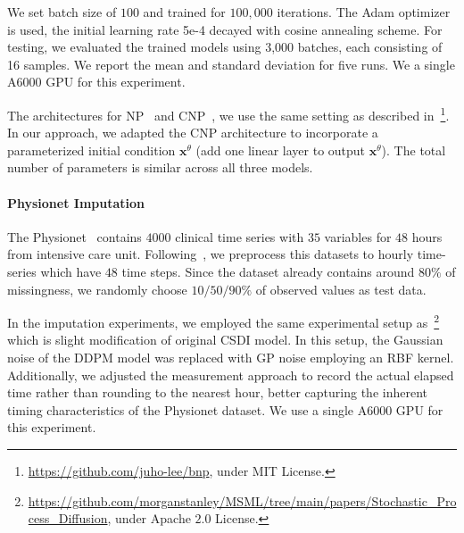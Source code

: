 \documentclass[nohyperref]{article}
\theoremstyle{plain}
\theoremstyle{remark}
\newcommand{\mb}{\mathbf}
\begin{document}
We set batch size of $100$ and trained for $100,000$ iterations. The Adam optimizer is used, the initial learning rate 5e-4 decayed with cosine annealing scheme. For testing, we evaluated the trained models using 3,000 batches, each consisting of 16 samples. We report the mean and standard deviation for five runs. We a single A$6000$ GPU for this experiment. 


The architectures for NP~\citep{garnelo2018neural} and CNP~\citep{pmlr-v80-garnelo18a}, we use the same setting as described in~\citep{lee2020bootstrapping}\footnote{\url{https://github.com/juho-lee/bnp}, under MIT License.}. In our approach, we adapted the CNP architecture to incorporate a parameterized initial condition $\mb{x}^{\theta}$ (add one linear layer to output $\mb{x}^{\theta}$). The total number of parameters is similar across all three models. 

\paragraph{Physionet Imputation} The Physionet~\citep{Physionet} contains $4000$ clinical time series with $35$ variables for $48$ hours from intensive care unit. Following~\citep{CSDI}, we preprocess this datasets to hourly time-series which have $48$ time steps. Since the dataset already contains around $80\%$ of missingness, we randomly choose $10/50/90\%$ of observed values as test data.

In the imputation experiments, we employed the same experimental setup as~\citep{bilovs2023modeling}\footnote{\url{https://github.com/morganstanley/MSML/tree/main/papers/Stochastic_Process_Diffusion}, under Apache $2.0$ License.} which is slight modification of original CSDI model. In this setup, the Gaussian noise of the DDPM model was replaced with GP noise employing an RBF kernel. Additionally, we adjusted the measurement approach to record the actual elapsed time rather than rounding to the nearest hour, better capturing the inherent timing characteristics of the Physionet dataset. We use a single A$6000$ GPU for this experiment. 





\newpage
\end{document}
